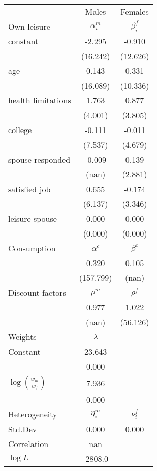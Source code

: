 \begin{tabular}{lcc} 
\hline\hline 
 & Males & Females \\ 
Own leisure & $\alpha_{i}^{m}$ & $\beta_{i}^{f}$ \\ 
constant & -2.295 & -0.910 \\ 
 & (16.242) & (12.626) \\ 
age & 0.143 & 0.331 \\ 
 & (16.089) & (10.336) \\ 
health limitations & 1.763 & 0.877 \\ 
 & (4.001) & (3.805) \\ 
college & -0.111 & -0.011 \\ 
 & (7.537) & (4.679) \\ 
spouse responded & -0.009 & 0.139 \\ 
 & (nan) & (2.881) \\ 
satisfied job & 0.655 & -0.174 \\ 
 & (6.137) & (3.346) \\ 
leisure spouse & 0.000 & 0.000 \\ 
 & (0.000) & (0.000) \\ 
Consumption & $\alpha^{c}$ & $\beta^{c}$ \\ 
 & 0.320 & 0.105 \\ 
 & (157.799) & (nan) \\ 
Discount factors & $\rho^m$ & $\rho^f$ \\ 
 & 0.977 & 1.022 \\ 
 & (nan) & (56.126) \\ 
Weights & $\lambda$ &  \\ 
Constant & 23.643 &  \\ 
 & 0.000 &  \\ 
$\log(\frac{w_m}{w_f})$ & 7.936 &  \\ 
 & 0.000 &  \\ 
Heterogeneity & $\eta_i^m$ & $\nu_i^f$ \\ 
Std.Dev & 0.000 & 0.000 \\ 
Correlation & nan &  \\ 
\hline 
$\log L$ & -2808.0 & \\ 
\hline \hline 
\end{tabular} 
